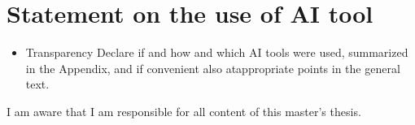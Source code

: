 \chapter{Statement on the use of AI tool}

\begin{itemize}
    \item Transparency
        Declare if and how and which AI tools were used, summarized in the Appendix, 
        and if convenient also atappropriate points in the general text.
\end{itemize}

I am aware that I am responsible for all content of this master’s thesis.